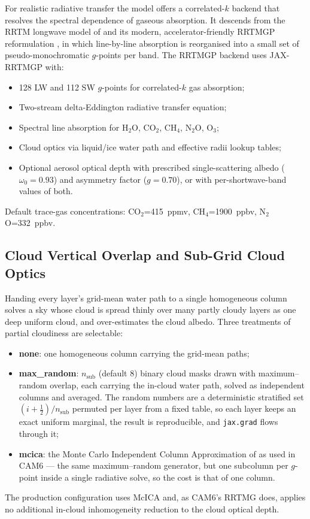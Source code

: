 \documentclass[11pt,twoside]{report}
\newcommand{\half}{\tfrac{1}{2}}
\begin{document}
For realistic radiative transfer the model offers a correlated-$k$ backend
that resolves the spectral dependence of gaseous absorption. It descends
from the RRTM longwave model of \citet{Mlawer1997} and its modern,
accelerator-friendly RRTMGP reformulation \citep{Pincus2019}, in which
line-by-line absorption is reorganised into a small set of pseudo-monochromatic
$g$-points per band. The RRTMGP backend uses JAX-RRTMGP with:
\begin{itemize}[nosep]
  \item 128 LW and 112 SW $g$-points for correlated-$k$ gas absorption;
  \item Two-stream delta-Eddington radiative transfer equation;
  \item Spectral line absorption for H$_2$O, CO$_2$, CH$_4$, N$_2$O, O$_3$;
  \item Cloud optics via liquid/ice water path and effective radii lookup
    tables;
  \item Optional aerosol optical depth with prescribed single-scattering
    albedo ($\omega_0=0.93$) and asymmetry factor ($g=0.70$), or with
    per-shortwave-band values of both.
\end{itemize}

Default trace-gas concentrations: CO$_2$=415~ppmv, CH$_4$=1900~ppbv,
N$_2$O=332~ppbv.

\subsection{Cloud Vertical Overlap and Sub-Grid Cloud Optics}
\label{sec:cloud-overlap}

Handing every layer's grid-mean water path to a single homogeneous column
solves a sky whose cloud is spread thinly over many partly cloudy layers as one
deep uniform cloud, and over-estimates the cloud albedo.  Three treatments of
partial cloudiness are selectable:
\begin{itemize}[nosep]
  \item \textbf{none}: one homogeneous column carrying the grid-mean paths;
  \item \textbf{max\_random}: $n_{\mathrm{sub}}$ (default 8) binary cloud
    masks drawn with maximum--random overlap, each carrying the in-cloud
    water path, solved as independent columns and averaged.  The random
    numbers are a deterministic stratified set $(i+\half)/n_{\mathrm{sub}}$
    permuted per layer from a fixed table, so each layer keeps an exact
    uniform marginal, the result is reproducible, and \texttt{jax.grad}
    flows through it;
  \item \textbf{mcica}: the Monte Carlo Independent Column Approximation of
    \citet{Pincus2003} as used in CAM6 --- the same maximum--random
    generator, but one subcolumn per $g$-point inside a single radiative
    solve, so the cost is that of one column.
\end{itemize}
The production configuration uses McICA and, as CAM6's RRTMG does, applies no
additional in-cloud inhomogeneity reduction to the cloud optical depth.
\end{document}
